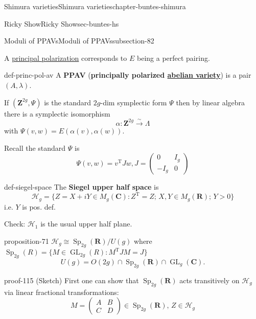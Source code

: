 \documentclass[oneside,10pt,]{book}
\newcommand{\terminology}[1]{\textbf{#1}}
\numberwithin{equation}{section}
\newcommand{\ZZ}{\mathbf{Z}}
\newcommand{\RR}{\mathbf{R}}
\newcommand{\CC}{\mathbf{C}}
\newcommand{\transpose}{\mathrm{T}}
\DeclareMathOperator{\GL}{GL}
\DeclareMathOperator{\Sp}{Sp}
\newcommand{\gt}{>}
\newcommand{\amp}{&}
\begin{document}
\begin{chapterptx}{Shimura varieties}{}{Shimura varieties}{}{}{chapter-buntes-shimura}
\begin{sectionptx}{Ricky Show}{}{Ricky Show}{}{}{sec-buntes-hs}
\begin{subsectionptx}{Moduli of PPAVs}{}{Moduli of PPAVs}{}{}{subsection-82}
\begin{enumerate}
\end{enumerate}
A \hyperref[def-polarization]{principal polarization} corresponds to \(E\) being a perfect pairing.%
\begin{definition}{}{def-princ-pol-av}%
\hypertarget{p-1125}{}%
A \terminology{PPAV} (\terminology{principally polarized \hyperref[def-buntes-abvar]{abelian variety}}) is a pair \((A,\lambda)\).%
\end{definition}
\hypertarget{p-1126}{}%
If \((\ZZ^{2g}, \Psi)\) is the standard \(2g\)-dim symplectic form \(\Psi\) then by linear algebra there is a symplectic isomorphism%
\begin{equation*}
\alpha \colon \ZZ^{2g} \xrightarrow\sim \Lambda
\end{equation*}
with \(\Psi(v,w) = E(\alpha(v), \alpha(w))\).%
\par
\hypertarget{p-1127}{}%
Recall the standard \(\Psi\) is%
\begin{equation*}
\Psi (v,w) = v^\transpose J w, J = \begin{pmatrix} 0 \amp I_g \\ -I_g \amp 0\end{pmatrix}
\end{equation*}
%
\begin{definition}{}{def-siegel-space}%
\hypertarget{p-1128}{}%
The \terminology{Siegel upper half space} is%
\begin{equation*}
\mathscr H_g = \{ Z = X+iY \in M_g(\CC) : Z^\transpose  = Z ; \, X,Y \in M_g(\RR); \, Y \gt 0\}
\end{equation*}
i.e. \(Y\) is pos. def.%
\end{definition}
\hypertarget{p-1129}{}%
Check: \(\mathscr H_1\) is the usual upper half plane.%
\begin{proposition}{}{}{proposition-71}%
\hypertarget{p-1130}{}%
\(\mathscr H_g \cong \Sp_{2g}(\RR)/U(g)\) where \(\Sp_{2g} (R) = \{ M \in \GL_{2g}(R) : M^\transpose J M = J\}\)%
\begin{equation*}
U(g) = O(2g) \cap \Sp_{2g}(\RR) \cap \GL_{g}(\CC)\text{.}
\end{equation*}
%
\end{proposition}
\begin{proofptx}{}{proof-115}
\hypertarget{p-1131}{}%
(Sketch) First one can show that \(\Sp_{2g}(\RR)\) acts transitively on \(\mathscr H_g\) via linear fractional transformations:%
\begin{equation*}
M = \begin{pmatrix} A\amp B\\ C\amp D\end{pmatrix} \in \Sp_{2g}(\RR),\, Z\in \mathscr H_g

\end{equation*}
\end{proofptx}
\end{subsectionptx}
\end{sectionptx}
\end{chapterptx}
\end{document}
